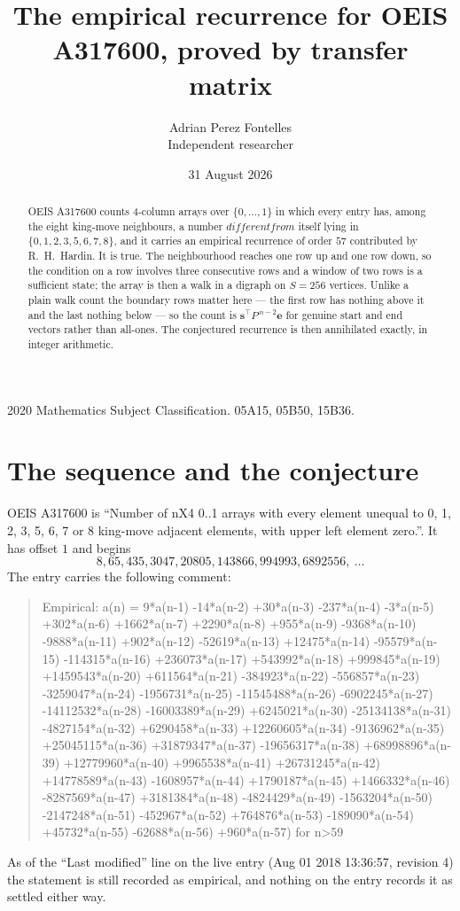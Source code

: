 \documentclass[11pt,a4paper]{article}
\title{The empirical recurrence for OEIS A317600, proved by transfer matrix}
\author{Adrian Perez Fontelles\\ \small Independent researcher}
\date{31 August 2026}
\theoremstyle{plain}
\theoremstyle{definition}
\begin{document}
\maketitle

\begin{abstract}
OEIS A317600 counts $4$-column arrays over $\{0,\dots,1\}$ in which every entry has,
among the eight king-move neighbours, a number $different from$ itself lying in $\{0,1,2,3,5,6,7,8\}$, and it carries an empirical
recurrence of order $57$ contributed by R.~H.~Hardin. It is true. The neighbourhood
reaches one row up and one row down, so the condition on a row involves three consecutive
rows and a window of two rows is a sufficient state; the array is then a walk in a digraph
on $S=256$ vertices. Unlike a plain walk count the boundary rows matter here --- the first
row has nothing above it and the last nothing below --- so the count is
$\mathbf{s}^{\!\top}P^{\,n-2}\mathbf{e}$ for genuine start and end vectors rather than
all-ones. The conjectured recurrence is then annihilated exactly, in integer arithmetic.
\end{abstract}

\noindent\small 2020 Mathematics Subject Classification. 05A15, 05B50, 15B36.\normalsize

\section{The sequence and the conjecture}

OEIS A317600 is ``Number of nX4 0..1 arrays with every element unequal to 0, 1, 2, 3, 5, 6, 7 or 8 king-move adjacent elements, with upper left element zero.''. It has offset
$1$ and begins
\[
8, 65, 435, 3047, 20805, 143866, 994993, 6892556,\ \dots
\]
The entry carries the following comment:
\begin{quote}\small
Empirical: a(n) = 9*a(n-1) -14*a(n-2) +30*a(n-3) -237*a(n-4) -3*a(n-5) +302*a(n-6) +1662*a(n-7) +2290*a(n-8) +955*a(n-9) -9368*a(n-10) -9888*a(n-11) +902*a(n-12) -52619*a(n-13) +12475*a(n-14) -95579*a(n-15) -114315*a(n-16) +236073*a(n-17) +543992*a(n-18) +999845*a(n-19) +1459543*a(n-20) +611564*a(n-21) -384923*a(n-22) -556857*a(n-23) -3259047*a(n-24) -1956731*a(n-25) -11545488*a(n-26) -6902245*a(n-27) -14112532*a(n-28) -16003389*a(n-29) +6245021*a(n-30) -25134138*a(n-31) -4827154*a(n-32) +6290458*a(n-33) +12260605*a(n-34) -9136962*a(n-35) +25045115*a(n-36) +31879347*a(n-37) -19656317*a(n-38) +68998896*a(n-39) +12779960*a(n-40) +9965538*a(n-41) +26731245*a(n-42) +14778589*a(n-43) -1608957*a(n-44) +1790187*a(n-45) +1466332*a(n-46) -8287569*a(n-47) +3181384*a(n-48) -4824429*a(n-49) -1563204*a(n-50) -2147248*a(n-51) -452967*a(n-52) +764876*a(n-53) -189090*a(n-54) +45732*a(n-55) -62688*a(n-56) +960*a(n-57) for n>59
\end{quote}
As of the ``Last modified'' line on the live entry (Aug 01 2018 13:36:57, revision
4) the statement is still recorded as empirical, and nothing on the entry
records it as settled either way.
\end{document}
